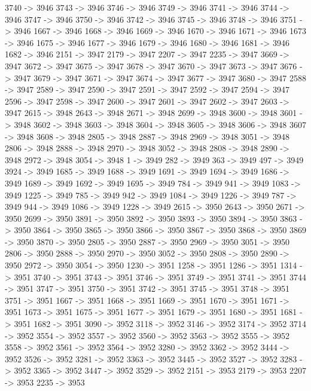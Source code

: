 {	3740 -> 3946
	3743 -> 3946
	3746 -> 3946
	3749 -> 3946
	3741 -> 3946
	3744 -> 3946
	3747 -> 3946
	3750 -> 3946
	3742 -> 3946
	3745 -> 3946
	3748 -> 3946
	3751 -> 3946
	1667 -> 3946
	1668 -> 3946
	1669 -> 3946
	1670 -> 3946
	1671 -> 3946
	1673 -> 3946
	1675 -> 3946
	1677 -> 3946
	1679 -> 3946
	1680 -> 3946
	1681 -> 3946
	1682 -> 3946
	2151 -> 3947
	2179 -> 3947
	2207 -> 3947
	2235 -> 3947
	3669 -> 3947
	3672 -> 3947
	3675 -> 3947
	3678 -> 3947
	3670 -> 3947
	3673 -> 3947
	3676 -> 3947
	3679 -> 3947
	3671 -> 3947
	3674 -> 3947
	3677 -> 3947
	3680 -> 3947
	2588 -> 3947
	2589 -> 3947
	2590 -> 3947
	2591 -> 3947
	2592 -> 3947
	2594 -> 3947
	2596 -> 3947
	2598 -> 3947
	2600 -> 3947
	2601 -> 3947
	2602 -> 3947
	2603 -> 3947
	2615 -> 3948
	2643 -> 3948
	2671 -> 3948
	2699 -> 3948
	3600 -> 3948
	3601 -> 3948
	3602 -> 3948
	3603 -> 3948
	3604 -> 3948
	3605 -> 3948
	3606 -> 3948
	3607 -> 3948
	3608 -> 3948
	2805 -> 3948
	2887 -> 3948
	2969 -> 3948
	3051 -> 3948
	2806 -> 3948
	2888 -> 3948
	2970 -> 3948
	3052 -> 3948
	2808 -> 3948
	2890 -> 3948
	2972 -> 3948
	3054 -> 3948
	1 -> 3949
	282 -> 3949
	363 -> 3949
	497 -> 3949
	3924 -> 3949
	1685 -> 3949
	1688 -> 3949
	1691 -> 3949
	1694 -> 3949
	1686 -> 3949
	1689 -> 3949
	1692 -> 3949
	1695 -> 3949
	784 -> 3949
	941 -> 3949
	1083 -> 3949
	1225 -> 3949
	785 -> 3949
	942 -> 3949
	1084 -> 3949
	1226 -> 3949
	787 -> 3949
	944 -> 3949
	1086 -> 3949
	1228 -> 3949
	2615 -> 3950
	2643 -> 3950
	2671 -> 3950
	2699 -> 3950
	3891 -> 3950
	3892 -> 3950
	3893 -> 3950
	3894 -> 3950
	3863 -> 3950
	3864 -> 3950
	3865 -> 3950
	3866 -> 3950
	3867 -> 3950
	3868 -> 3950
	3869 -> 3950
	3870 -> 3950
	2805 -> 3950
	2887 -> 3950
	2969 -> 3950
	3051 -> 3950
	2806 -> 3950
	2888 -> 3950
	2970 -> 3950
	3052 -> 3950
	2808 -> 3950
	2890 -> 3950
	2972 -> 3950
	3054 -> 3950
	1230 -> 3951
	1258 -> 3951
	1286 -> 3951
	1314 -> 3951
	3740 -> 3951
	3743 -> 3951
	3746 -> 3951
	3749 -> 3951
	3741 -> 3951
	3744 -> 3951
	3747 -> 3951
	3750 -> 3951
	3742 -> 3951
	3745 -> 3951
	3748 -> 3951
	3751 -> 3951
	1667 -> 3951
	1668 -> 3951
	1669 -> 3951
	1670 -> 3951
	1671 -> 3951
	1673 -> 3951
	1675 -> 3951
	1677 -> 3951
	1679 -> 3951
	1680 -> 3951
	1681 -> 3951
	1682 -> 3951
	3090 -> 3952
	3118 -> 3952
	3146 -> 3952
	3174 -> 3952
	3714 -> 3952
	3554 -> 3952
	3557 -> 3952
	3560 -> 3952
	3563 -> 3952
	3555 -> 3952
	3558 -> 3952
	3561 -> 3952
	3564 -> 3952
	3280 -> 3952
	3362 -> 3952
	3444 -> 3952
	3526 -> 3952
	3281 -> 3952
	3363 -> 3952
	3445 -> 3952
	3527 -> 3952
	3283 -> 3952
	3365 -> 3952
	3447 -> 3952
	3529 -> 3952
	2151 -> 3953
	2179 -> 3953
	2207 -> 3953
	2235 -> 3953
}
